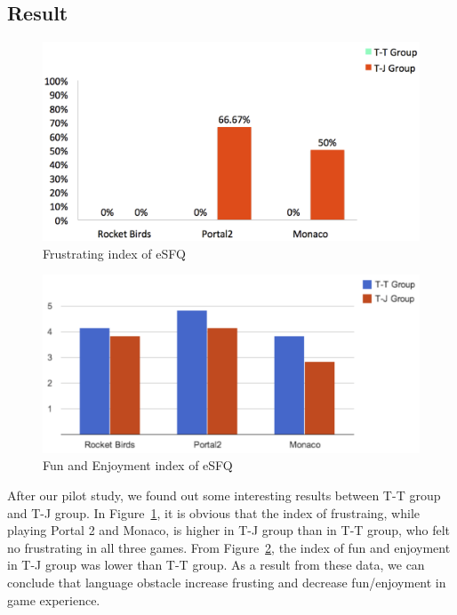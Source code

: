 \subsection{Result}

\begin{figure}[!h]
\centering
\includegraphics[width=0.9\columnwidth]{Figures/PS_Frus.png}
\caption{Frustrating index of eSFQ}
\label{fig:PS_Frus}
\end{figure}

\begin{figure}[!h]
\centering
\includegraphics[width=0.9\columnwidth]{Figures/PS_FunAndEnj.png}
\caption{Fun and Enjoyment index of eSFQ}
\label{fig:PS_FunAndEnj.png}
\end{figure}


After our pilot study, we found out some interesting results between T-T group and T-J group. In Figure~\ref{fig:PS_Frus}, it is obvious that the index of frustraing, while playing Portal 2 and Monaco, is higher in T-J group than in T-T group, who felt no frustrating in all three games. From Figure~\ref{fig:PS_FunAndEnj.png}, the index of fun and enjoyment in T-J group was lower than T-T group. As a result from these data, we can conclude that language obstacle increase frusting and decrease fun/enjoyment in game experience.


